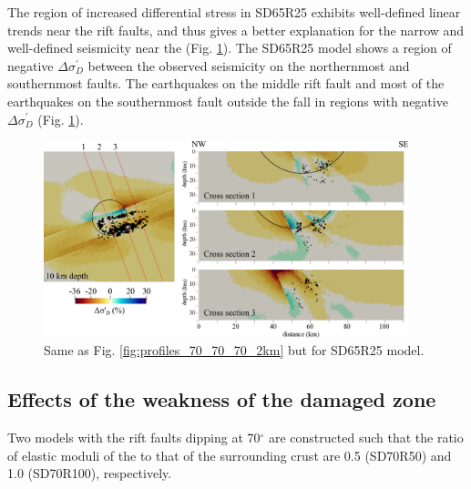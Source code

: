 \documentclass[draft]{agujournal2018}
\begin{document}
The region of increased differential stress in SD65R25 exhibits well-defined linear trends near the rift faults, and thus gives a better explanation for the narrow and well-defined seismicity near the   (Fig. \ref{fig:profiles_65_40_40_2km}). The SD65R25 model shows a region of negative $\Delta\sigma_{D}^{\prime}$ between the observed seismicity on the northernmost and southernmost faults. The earthquakes on the middle rift fault and most of the earthquakes on the southernmost fault outside the  fall in regions with negative $\Delta\sigma_{D}^{\prime}$ (Fig. \ref{fig:profiles_65_40_40_2km}).

\begin{figure}[ht]
\centering
\includegraphics[width=25pc]{Figures/SD65R25_profiles.png}
\caption{Same as Fig. \ref{fig:profiles_70_70_70_2km} but for SD65R25 model.}
\label{fig:profiles_65_40_40_2km}
\end{figure}

\subsection{Effects of the weakness of the damaged  zone}
Two models with the rift faults dipping at 70$^{\circ}$ are constructed such that the ratio of elastic moduli of the  to that of the surrounding crust are 0.5 (SD70R50) and 1.0 (SD70R100), respectively.
\end{document}
